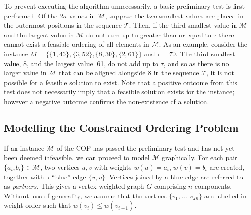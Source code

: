 \documentclass[a4paper,11pt,authoryear]{elsarticle}
\begin{document}
To prevent executing the algorithm unnecessarily, a basic preliminary test is first performed. Of the $2n$ values in $\mathcal{M}$, suppose the two smallest values are placed in the outermost positions in the sequence $\mathcal{T}$. Then, if the third smallest value in $\mathcal{M}$ and the largest value in $\mathcal{M}$ do not sum up to greater than or equal to $\tau$ there cannot exist a feasible ordering of all elements in $\mathcal{M}$. As an example, consider the instance $M = \{\{1,46\}, \{3,52\}, \{8,30\}, \{2, 61\}\}$ and $\tau =70$. The third smallest value, 8, and the largest value, 61, do not add up to $\tau$, and so as there is no larger value in $\mathcal{M}$ that can be aligned alongside 8 in the sequence $\mathcal{T}$, it is not possible for a feasible solution to exist. Note that a positive outcome from this test does not necessarily imply that a feasible solution exists for the instance; however a negative outcome confirms the non-existence of a solution.


\subsection{Modelling the Constrained Ordering Problem}
\label{sub:modelcop}

\noindent If an instance $\mathcal{M}$ of the COP has passed the preliminary test and has not yet been deemed infeasible, we can proceed to model $\mathcal{M}$ graphically. For each pair $\{a_i, b_i\} \in \mathcal{M}$, two vertices $u, v$ with weights $w(u) = a_i$, $w(v) = b_i$ are created, together with a ``blue'' edge $\{u, v\}$. Vertices joined by a blue edge are referred to as \textit{partners}. This gives a vertex-weighted graph $G$ comprising $n$ components. Without loss of generality, we assume that the vertices $\{v_1,\dotsc,v_{2n}\}$ are labelled in weight order such that $w(v_i) \leq w(v_{i+1})$.
\end{document}

